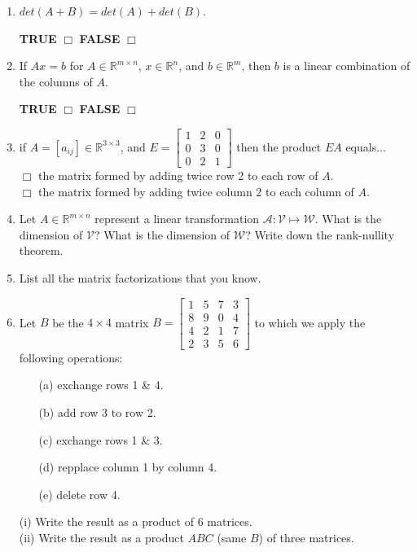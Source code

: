\documentclass[14pt]{report}
\begin{document}
\begin{enumerate}
\item $det(A+B)=det(A)+det(B)$.

 \quad \textbf{TRUE} $\Box$ \quad\textbf{FALSE} $\Box$ 
  
\item If $Ax=b$ for $A \in \mathbb{R}^{m\times n}$, $x\in\mathbb{R}^n$, and  
 $b\in\mathbb{R}^m$, then $b$ is a linear combination of the columns of $A$.

 \quad \textbf{TRUE} $\Box$ \quad\textbf{FALSE} $\Box$ 

\item if $A=[a_{ij}]\in\mathbb{R}^{3\times 3}$, and $E=\left[\begin{array}{ccc}
  1&2&0\\0&3&0\\0&2&1\end{array}\right]$ then the product $EA$ equals...\\

     $\Box$ the matrix formed by adding twice row 2 to each row of $A$.\\
     $\Box$ the matrix formed by adding twice column 2 to each column of $A$. 


\item Let $A\in\mathbb{R}^{m\times n}$ represent a linear transformation
  $\mathcal{A}:\mathcal{V}\mapsto \mathcal{W}$. What is the dimension of $\mathcal{V}$?
What is the dimension of $\mathcal{W}$? Write down the rank-nullity theorem.


\item List all the matrix factorizations that you know.



\item Let $B$ be the $4\times4$ matrix $B=\left[\begin{array}{cccc}
  1&5&7&3\\8&9&0&4\\4&2&1&7\\2&3&5&6\end{array}\right]$ to which we apply the following operations:
        \begin{enumerate}
          \item[(a)] exchange rows 1 \& 4.
          \item[(b)] add row 3 to row 2.
          \item[(c)] exchange rows 1 \& 3.
          \item[(d)] repplace column 1 by column 4.
          \item[(e)] delete row 4.  
        \end{enumerate}
(i) Write the result as a product of 6 matrices.\\
(ii) Write the result as a product $ABC$ (same $B$) of three matrices.



\end{enumerate}
\end{document}
